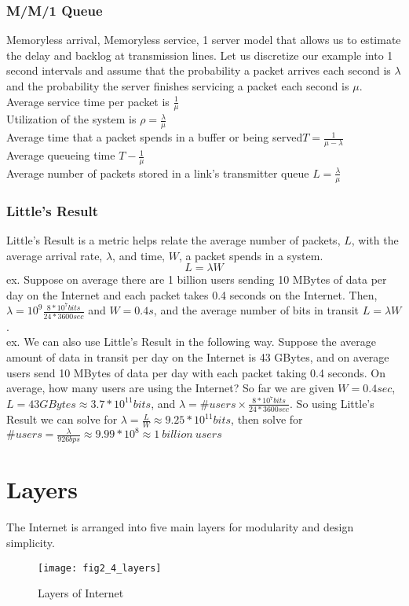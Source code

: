 \subsubsection*{M/M/1 Queue}
Memoryless arrival, Memoryless service, 1 server model that allows us to estimate the delay and backlog at transmission lines. Let us discretize our example into 1 second intervals and assume that the probability a packet arrives each second is $\lambda$ and the probability the server finishes servicing a packet each second is $\mu$. \\
Average service time per packet is $\frac{1}{\mu}$ \\
Utilization of the system is $\rho = \frac{\lambda}{\mu}$ \\
Average time that a packet spends in a buffer or being served$T = \frac{1}{\mu-\lambda}$ \\ 
Average queueing time $T-\frac{1}{\mu}$\\
Average number of packets  stored in a link's transmitter queue $L = \frac{\lambda}{\mu}$
\subsubsection*{Little's Result}
Little's Result is a metric helps relate the average number of packets, $L$, with the average arrival rate, $\lambda$, and  time, $W$, a packet spends in a system. 
$$L = \lambda W$$
ex. Suppose on average there are 1 billion users sending 10 MBytes of data per day on the Internet and each packet takes 0.4 seconds on the Internet. Then, $\lambda = 10^9 \frac{8*10^7 bits}{24 * 3600 sec}$ and $W = 0.4s$, and the average number of bits in transit $L = \lambda W$. \\ 
ex. We can also use Little's Result in the following way. Suppose the average amount of data in transit per day on the Internet is 43 GBytes, and on average users send 10 MBytes of data per day with each packet taking 0.4 seconds. On average, how many users are using the Internet? So far we are given $W = 0.4 sec$, $L = 43 GBytes \approx 3.7*10^11 bits$, and $\lambda = \# users \times \frac{8*10^7 bits}{24 * 3600 sec}$. So using Little's Result we can solve for $\lambda = \frac{L}{W} \approx 9.25*10^11 bits$, then solve for $\# users = \frac{\lambda}{926 bps} \approx 9.99 * 10^8 \approx 1\ billion\ users$ 

\section{Layers}
The Internet is arranged into five main layers for modularity and design simplicity. 
\begin{figure}[!htbp]
    \centering
    \texttt{[image: fig2\_4\_layers]}
    \caption{Layers of Internet}
    \label{fig:layers}
\end{figure}

